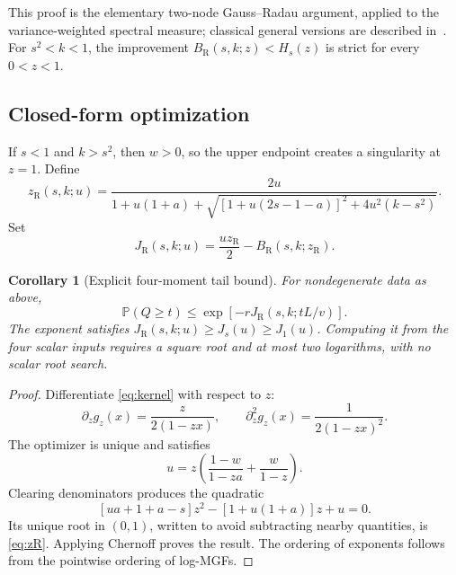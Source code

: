 \documentclass[11pt,letterpaper]{article}
\numberwithin{equation}{section}
\newtheorem{corollary}[theorem]{Corollary}
\theoremstyle{definition}\newtheorem{definition}[theorem]{Definition}
\theoremstyle{remark}\newtheorem{remark}[theorem]{Remark}
\newcommand{\PP}{\mathbb P}
\newcommand{\jRad}{J_{\mathrm R}}
\newcommand{\bRad}{B_{\mathrm R}}
\begin{document}
This proof is the elementary two-node Gauss--Radau argument, applied
to the variance-weighted spectral measure; classical general versions
are described in~\cite{BaiGolub}. For $s^2<k<1$, the improvement
$\bRad(s,k;z)<H_s(z)$ is strict for every $0<z<1$.

\subsection{Closed-form optimization}
If $s<1$ and $k>s^2$, then $w>0$, so the upper endpoint creates a
singularity at $z=1$. Define
\begin{equation}\label{eq:zR}
 z_{\mathrm R}(s,k;u)=
 \frac{2u}{1+u(1+a)+
 \sqrt{[1+u(2s-1-a)]^2+4u^2(k-s^2)}}.
\end{equation}
Set
\begin{equation}\label{eq:JR}
 \jRad(s,k;u)=\frac{u z_{\mathrm R}}2-
                 \bRad(s,k;z_{\mathrm R}).
\end{equation}

\begin{corollary}[Explicit four-moment tail bound]\label{cor:Rtail}
For nondegenerate data as above,
\begin{equation}\label{eq:radau-tail}
 \boxed{\displaystyle\PP(Q\ge t)\le
 \exp[-r\jRad(s,k;tL/v)].}
\end{equation}
The exponent satisfies $\jRad(s,k;u)\ge J_s(u)\ge J_1(u)$.
Computing it from the four scalar inputs requires a square root and
at most two logarithms, with no scalar root search.
\end{corollary}
\begin{proof}
Differentiate \eqref{eq:kernel} with respect to $z$:
\[
 \partial_z g_z(x)=\frac z{2(1-zx)},\qquad
 \partial_z^2g_z(x)=\frac1{2(1-zx)^2}.
\]
The optimizer is unique and satisfies
\begin{equation}\label{eq:Radau-saddle}
 u=z\left(\frac{1-w}{1-za}+\frac w{1-z}\right).
\end{equation}
Clearing denominators produces the quadratic
\[
 [ua+1+a-s]z^2-[1+u(1+a)]z+u=0.
\]
Its unique root in $(0,1)$, written to avoid subtracting nearby quantities,
is \eqref{eq:zR}. Applying Chernoff proves the result. The ordering
of exponents follows from the pointwise ordering of log-MGFs.
\end{proof}
\end{document}
